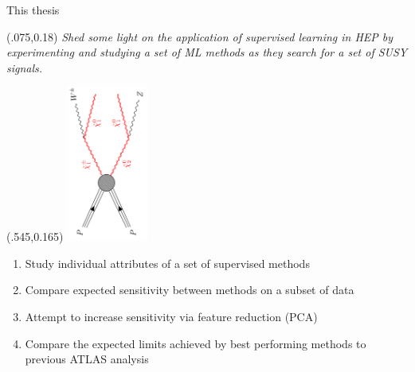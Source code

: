 \documentclass[UKenglish]{beamer}
\begin{document}

\begin{frame}{This thesis}
    \begin{textblock}{0.45}(.075,0.18)
        \emph{Shed some light on the application of supervised learning in HEP by 
        experimenting and studying a set of ML methods as they search for a set of SUSY signals.}
    \end{textblock}
    \begin{textblock}{1}(.545,0.165)
    \includegraphics[width=0.2\textwidth, angle = -90]{figures/WZSignal.png}
    \end{textblock}
    \vspace{2cm}
    \vfill
    \begin{enumerate}
        \item Study individual attributes of a set of supervised methods 
        \item Compare expected sensitivity between methods on a subset of data
        \item Attempt to increase sensitivity via feature reduction (PCA)
        \item Compare the expected limits achieved by best performing methods 
              to previous ATLAS analysis
    \end{enumerate}
    \centering
\end{frame}
\end{document}
